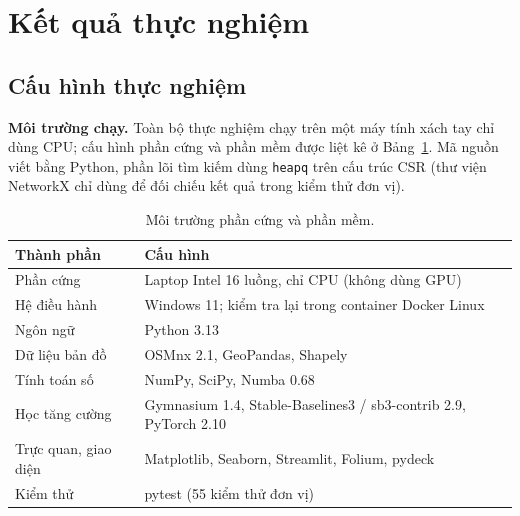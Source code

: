 \section{Kết quả thực nghiệm}\label{sec:exp}

\subsection{Cấu hình thực nghiệm}\label{sec:exp:setup}

\textbf{Môi trường chạy.} Toàn bộ thực nghiệm chạy trên một máy tính xách tay chỉ dùng CPU; cấu hình phần cứng và phần
mềm được liệt kê ở Bảng~\ref{tab:env}. Mã nguồn viết bằng Python, phần lõi tìm kiếm dùng \texttt{heapq} trên cấu trúc
CSR (thư viện NetworkX chỉ dùng để đối chiếu kết quả trong kiểm thử đơn vị).

\begin{table}[H]
\centering\small
\renewcommand{\arraystretch}{1.2}
\caption{Môi trường phần cứng và phần mềm.}
\label{tab:env}
\begin{tabularx}{\linewidth}{>{\raggedright\arraybackslash}p{4.2cm}X}
\toprule
\textbf{Thành phần} & \textbf{Cấu hình} \\
\midrule
Phần cứng & Laptop Intel 16 luồng, chỉ CPU (không dùng GPU) \\
Hệ điều hành & Windows 11; kiểm tra lại trong container Docker Linux \\
Ngôn ngữ & Python 3.13 \\
Dữ liệu bản đồ & OSMnx 2.1, GeoPandas, Shapely \\
Tính toán số & NumPy, SciPy, Numba 0.68 \\
Học tăng cường & Gymnasium 1.4, Stable-Baselines3 / sb3-contrib 2.9, PyTorch 2.10 \\
Trực quan, giao diện & Matplotlib, Seaborn, Streamlit, Folium, pydeck \\
Kiểm thử & pytest (55 kiểm thử đơn vị) \\
\bottomrule
\end{tabularx}
\end{table}

